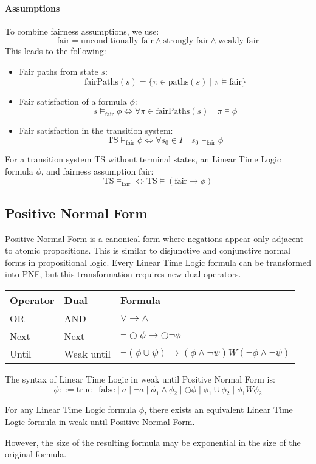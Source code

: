\paragraph*{Assumptions}
To combine fairness assumptions, we use:
\[\text{fair}=\text{unconditionally fair}\land\text{strongly fair}\land\text{weakly fair}\]
\noindent This leads to the following:
\begin{itemize}
    \item Fair paths from state $s$: 
        \[\text{fairPaths}(s)=\{\pi\in\text{paths}(s)\mid\pi\models\text{fair}\}\]
    \item Fair satisfaction of a formula $\phi$: 
        \[s\models_{\text{fair}}\phi\Leftrightarrow\forall\pi\in\text{fairPaths}(s)\quad\pi\models\phi\]
    \item Fair satisfaction in the transition system: 
        \[\text{TS}\models_{\text{fair}}\phi\Leftrightarrow\forall s_0\in I\quad s_0\models_{\text{fair}}\phi\]
\end{itemize}
\begin{theorem}
    For a transition system $\text{TS}$ without terminal states, an Linear Time Logic formula $\phi$, and fairness assumption $\text{fair}$: 
    \[\text{TS}\models_{\text{fair}}\Leftrightarrow\text{TS}\models(\text{fair}\rightarrow\phi)\]
\end{theorem}

\subsection{Positive Normal Form}
Positive Normal Form is a canonical form where negations appear only adjacent to atomic propositions. 
This is similar to disjunctive and conjunctive normal forms in propositional logic.
Every Linear Time Logic formula can be transformed into PNF, but this transformation requires new dual operators.
\begin{table}[H]
    \centering
    \begin{tabular}{|l|l|l|}
    \hline
    \textbf{Operator} & \textbf{Dual} & \textbf{Formula} \\ \hline
    OR                & AND           & $\lor\rightarrow\land$                \\ \hline
    Next              & Next          & $\lnot\bigcirc\phi\rightarrow\bigcirc\lnot\phi$                 \\ \hline
    Until             & Weak until    & $\lnot(\phi\cup\psi)\rightarrow(\phi\land\lnot\psi)W(\lnot\phi\land\lnot\psi)$                \\ \hline
    \end{tabular}
\end{table}
The syntax of Linear Time Logic in weak until Positive Normal Form is:
\[\phi::=\text{true}\mid\text{false}\mid a \mid\lnot a\mid \phi_1\land\phi_2\mid\bigcirc\phi\mid\phi_1\cup\phi_2\mid\phi_1 W\phi_2\]
\begin{theorem}
    For any Linear Time Logic formula $\phi$, there exists an equivalent Linear Time Logic formula in weak until Positive Normal Form. 
\end{theorem}
\noindent However, the size of the resulting formula may be exponential in the size of the original formula.

